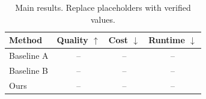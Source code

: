 \begin{table}[t]
  \centering
  \caption{Main results. Replace placeholders with verified values.}
  \label{tab:main-results}
  \begin{tabular}{lccc}
    \toprule
    Method & Quality $\uparrow$ & Cost $\downarrow$ & Runtime $\downarrow$ \\
    \midrule
    Baseline A & -- & -- & -- \\
    Baseline B & -- & -- & -- \\
    Ours & -- & -- & -- \\
    \bottomrule
  \end{tabular}
\end{table}
